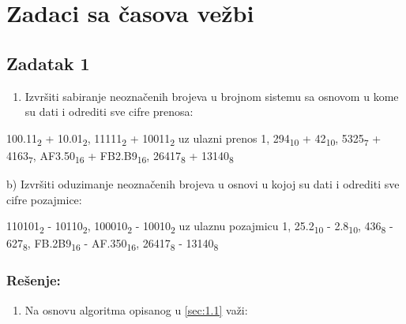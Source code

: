 \documentclass[a4paper,11pt]{article}
\numberwithin{equation}{section}
\begin{document}
\section{Zadaci sa časova vežbi}\label{sec:2}


\FloatBarrier
\subsection{Zadatak 1}\label{sec:2.1}


\begin{enumerate}[label=\alph*),start=1,leftmargin=*]
\item Izvršiti sabiranje neoznačenih brojeva u brojnom sistemu sa osnovom u kome su dati i odrediti sve cifre prenosa:

\end{enumerate}


100.11\textsubscript{2} + 10.01\textsubscript{2}, 11111\textsubscript{2} + 10011\textsubscript{2} uz ulazni prenos 1, 294\textsubscript{10} + 42\textsubscript{10}, 5325\textsubscript{7} + 4163\textsubscript{7}, AF3.50\textsubscript{16} + FB2.B9\textsubscript{16}, 26417\textsubscript{8} + 13140\textsubscript{8}



b) Izvršiti oduzimanje neoznačenih brojeva u osnovi u kojoj su dati i odrediti sve cifre pozajmice:

110101\textsubscript{2} - 10110\textsubscript{2}, 100010\textsubscript{2} - 10010\textsubscript{2} uz ulaznu pozajmicu 1, 25.2\textsubscript{10} - 2.8\textsubscript{10}, 436\textsubscript{8} - 627\textsubscript{8}, FB.2B9\textsubscript{16} - AF.350\textsubscript{16}, 26417\textsubscript{8} - 13140\textsubscript{8}



\subsubsection*{Rešenje:}


\begin{enumerate}[label=\alph*),start=1,leftmargin=*]
\item Na osnovu algoritma opisanog u \ref{sec:1.1} važi:

\end{enumerate}
\end{document}
